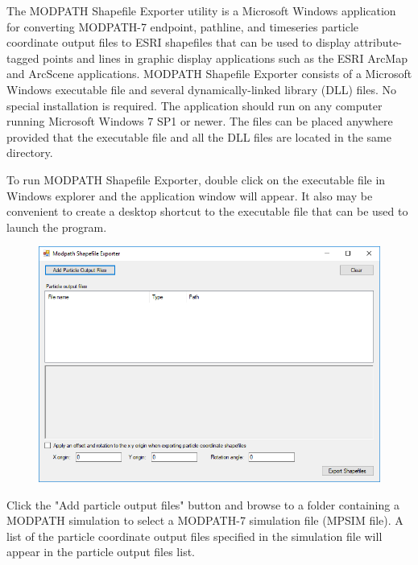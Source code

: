 \documentclass[11pt,twoside,twocolumn]{usgsreport}
\begin{document}
\makefrontcover
\makefrontmatterabv
\pagestyle{body}
The MODPATH Shapefile Exporter utility is a Microsoft Windows application for converting MODPATH-7 endpoint, pathline, and timeseries particle coordinate output files to ESRI shapefiles that can be used to display attribute-tagged points and lines in graphic display applications such as the ESRI ArcMap and ArcScene applications.
MODPATH Shapefile Exporter consists of a Microsoft Windows executable file and several dynamically-linked library (DLL) files. No special installation is required. The application should run on any computer running Microsoft Windows 7 SP1 or newer. The files can be placed anywhere provided that the executable file and all the DLL files are located in the same directory.

To run MODPATH Shapefile Exporter, double click on the executable file in Windows explorer and the application window will appear. It also may be convenient to create a desktop shortcut to the executable file that can be used to launch the program.
\begin{figure}[H]
 \centering
  \includegraphics[width=\linewidth]{mf_shp_ex_1.PNG}
\end{figure}

Click the "Add particle output files" button and browse to a folder containing a MODPATH simulation to select a MODPATH-7 simulation file (MPSIM file). A list of the particle coordinate output files specified in the simulation file will appear in the particle output files list.
\end{document}
